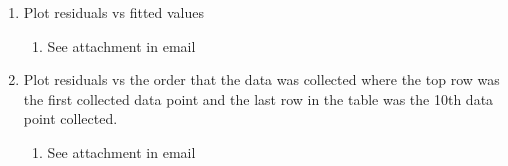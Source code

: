 \documentclass[krantz1,ChapterTOCs]{krantz}
\begin{document}
\begin{enumerate}

\begin{enumerate}
        \item Plot residuals vs fitted values
        \begin{enumerate}
            \item {\color{red}
            See attachment in email 
            }
        \end{enumerate}


        \item Plot residuals vs the order that the data was collected where the top row was the first collected data point and the last row in the table was the 10th data point collected. 
            \begin{enumerate}
            \item {\color{red}
            
            See attachment in email
            
            }
        \end{enumerate}



\end{enumerate}
\end{enumerate}
\end{document}
